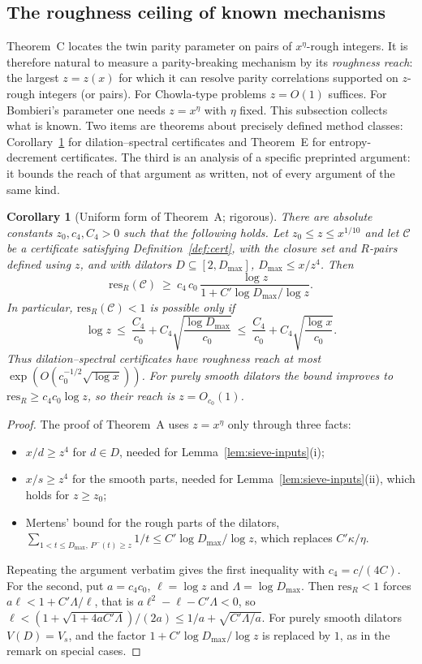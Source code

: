 \documentclass[11pt]{amsart}
\newtheorem{corollary}[theorem]{Corollary}
\theoremstyle{definition}
\theoremstyle{remark}
\newcommand{\res}{\mathrm{res}}
\begin{document}
\subsection{The roughness ceiling of known mechanisms}\label{sec:ceiling}
Theorem~C locates the twin parity parameter on pairs of $x^\eta$-rough integers. It is therefore natural to measure a parity-breaking mechanism by its \emph{roughness reach}: the largest $z=z(x)$ for which it can resolve parity correlations supported on $z$-rough integers (or pairs). For Chowla-type problems $z=O(1)$ suffices. For Bombieri's parameter one needs $z=x^\eta$ with $\eta$ fixed. This subsection collects what is known. Two items are theorems about precisely defined method classes: Corollary~\ref{cor:ceiling} for dilation--spectral certificates and Theorem~E for entropy-decrement certificates. The third is an analysis of a specific preprinted argument: it bounds the reach of that argument as written, not of every argument of the same kind.

\begin{corollary}[Uniform form of Theorem~A; rigorous]\label{cor:ceiling}
There are absolute constants $z_0,c_4,C_4>0$ such that the following holds. Let $z_0\le z\le x^{1/10}$ and let $\mathcal C$ be a certificate satisfying Definition~\ref{def:cert}, with the closure set and $R$-pairs defined using $z$, and with dilators $D\subseteq[2,D_{\max}]$, $D_{\max}\le x/z^4$. Then
\[
\res_R(\mathcal C)\ \ge\ c_4\,c_0\,\frac{\log z}{1+C'\log D_{\max}/\log z}.
\]
In particular, $\res_R(\mathcal C)<1$ is possible only if
\[
\log z\ \le\ \frac{C_4}{c_0}+C_4\sqrt{\frac{\log D_{\max}}{c_0}}\ \le\ \frac{C_4}{c_0}+C_4\sqrt{\frac{\log x}{c_0}} .
\]
Thus dilation--spectral certificates have roughness reach at most $\exp(O(c_0^{-1/2}\sqrt{\log x}))$. For purely smooth dilators the bound improves to $\res_R\ge c_4c_0\log z$, so their reach is $z=O_{c_0}(1)$.
\end{corollary}
\begin{proof}
The proof of Theorem~A uses $z=x^\eta$ only through three facts:
\begin{itemize}
\item $x/d\ge z^4$ for $d\in D$, needed for Lemma~\ref{lem:sieve-inputs}(i);
\item $x/s\ge z^4$ for the smooth parts, needed for Lemma~\ref{lem:sieve-inputs}(ii), which holds for $z\ge z_0$;
\item Mertens' bound for the rough parts of the dilators, $\sum_{1<t\le D_{\max},\,P^-(t)\ge z}1/t\le C'\log D_{\max}/\log z$, which replaces $C'\kappa/\eta$.
\end{itemize}
Repeating the argument verbatim gives the first inequality with $c_4=c/(4C)$. For the second, put $a=c_4c_0$, $\ell=\log z$ and $\Lambda=\log D_{\max}$. Then $\res_R<1$ forces $a\ell<1+C'\Lambda/\ell$, that is $a\ell^2-\ell-C'\Lambda<0$, so $\ell<(1+\sqrt{1+4aC'\Lambda})/(2a)\le1/a+\sqrt{C'\Lambda/a}$. For purely smooth dilators $V(D)=V_s$, and the factor $1+C'\log D_{\max}/\log z$ is replaced by $1$, as in the remark on special cases.
\end{proof}
\end{document}
